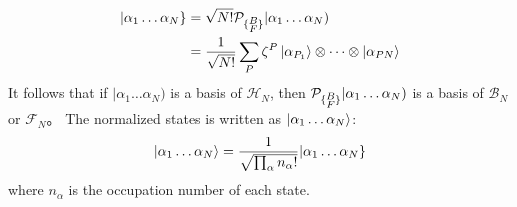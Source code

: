 \documentclass[12pt]{article}
\begin{document}
\begin{equation*}
    \begin{split}
        |\alpha_1\dots\alpha_N\}&=\sqrt{N!}\mathcal{P}_{\{\substack{\small B\\\small F}\}}
        |\alpha_1\dots\alpha_N)\\
        &=\frac{1}{\sqrt{N!}}\sum_P\zeta^P\ket{\alpha_{P_1}}\otimes\dots\otimes
        \ket{\alpha_{PN}}
    \end{split}
\end{equation*}
It follows that if $|\alpha_1\dots\alpha_N)$ is a basis of $\mathcal{H}_N$, 
then $\mathcal{P}_{\{\substack{\small B\\\small F}\}}|\alpha_1\dots\alpha_N)$ is 
a basis of $\mathcal{B}_N$ or $\mathcal{F}_N$。
The normalized states is written as $\ket{\alpha_1\dots\alpha_N}$:
\begin{equation*}
    \ket{\alpha_1\dots\alpha_N}=\frac{1}{\sqrt{\prod_\alpha n_\alpha!}}
    |\alpha_1\dots\alpha_N\}
\end{equation*}
where $n_\alpha$ is the occupation number of each state.
\end{document}
